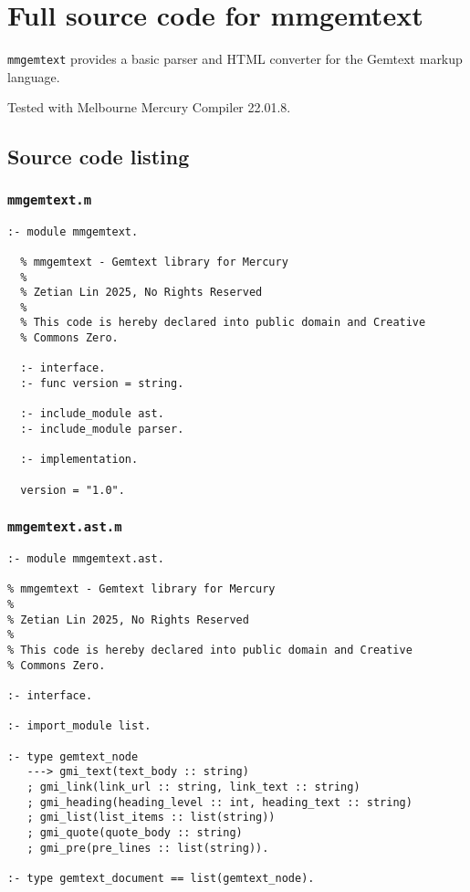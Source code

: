 \chapter{Full source code for mmgemtext}

\texttt{mmgemtext} provides a basic parser and HTML converter for the Gemtext markup language.

Tested with Melbourne Mercury Compiler 22.01.8.

\section{Source code listing}

\subsection{\texttt{mmgemtext.m}}

\begin{lstlisting}[language=Mercury]
  :- module mmgemtext.

  % mmgemtext - Gemtext library for Mercury
  %
  % Zetian Lin 2025, No Rights Reserved
  %
  % This code is hereby declared into public domain and Creative
  % Commons Zero.

  :- interface.
  :- func version = string.
  
  :- include_module ast.
  :- include_module parser.
  
  :- implementation.
  
  version = "1.0".
\end{lstlisting}

\subsection{\texttt{mmgemtext.ast.m}}

\begin{lstlisting}[language=Mercury]
:- module mmgemtext.ast.
  
% mmgemtext - Gemtext library for Mercury
%
% Zetian Lin 2025, No Rights Reserved
%
% This code is hereby declared into public domain and Creative
% Commons Zero.  

:- interface.

:- import_module list.

:- type gemtext_node
   ---> gmi_text(text_body :: string)
   ; gmi_link(link_url :: string, link_text :: string)
   ; gmi_heading(heading_level :: int, heading_text :: string)
   ; gmi_list(list_items :: list(string))
   ; gmi_quote(quote_body :: string)
   ; gmi_pre(pre_lines :: list(string)).

:- type gemtext_document == list(gemtext_node).
\end{lstlisting}

